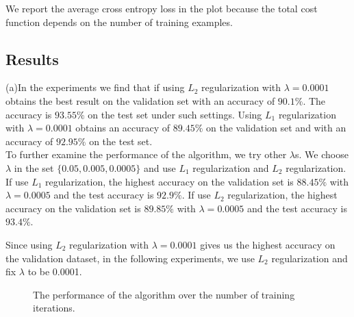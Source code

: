 \documentclass{article} %
\begin{document}
We report the average cross entropy loss in the plot because the total cost function depends on the number of training examples. 
 
\subsection{Results}
(a)In the experiments we find that if using $L_2$ regularization with $\lambda = 0.0001$ obtains the best result on the validation set with an accuracy of $90.1\%$. The accuracy is $93.55\%$ on the test set under such settings. Using $L_1$ regularization with $\lambda = 0.0001$ obtains an accuracy of $89.45\%$ on the validation set and with an accuracy of $92.95\%$ on the test set.
\\

To further examine the performance of the algorithm, we try other $\lambda$s. We choose $\lambda$ in the set $\{0.05,0.005,0.0005\}$ and use $L_1$ regularization and $L_2$ regularization. If use $L_1$ regularization, the highest accuracy on the validation set is $88.45\%$ with $\lambda = 0.0005$ and the test accuracy is $92.9\%$. If use $L_2$ regularization, the highest accuracy on the validation set is $89.85\%$ with $\lambda = 0.0005$ and the test accuracy is $93.4\%$. 


Since using $L_2$ regularization with $\lambda = 0.0001$ gives us the highest accuracy on the validation dataset, in the following experiments, we use $L_2$ regularization and fix $\lambda$ to be 0.0001.

\begin{figure}[t]%
	\centering
	\qquad
	\caption{The performance of the algorithm over the number of training iterations. }%
\end{figure}
\end{document}
